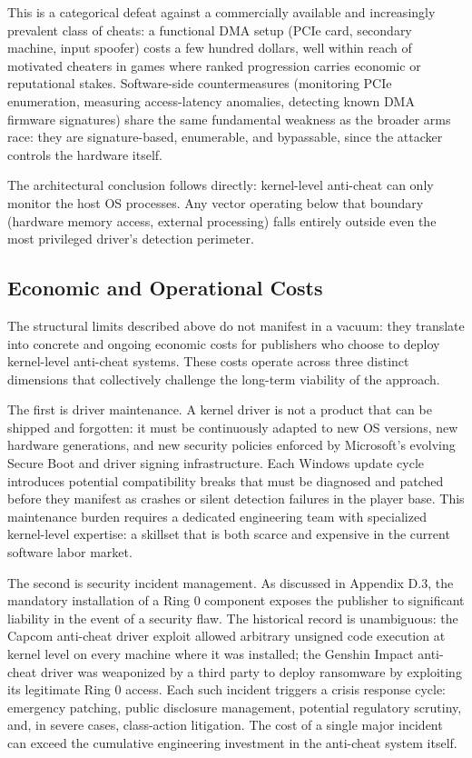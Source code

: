 This is a categorical defeat against a commercially available and increasingly prevalent class of cheats: a functional DMA setup (PCIe card, secondary machine, input spoofer) costs a few hundred dollars, well within reach of motivated cheaters in games where ranked progression carries economic or reputational stakes. Software-side countermeasures (monitoring PCIe enumeration, measuring access-latency anomalies, detecting known DMA firmware signatures) share the same fundamental weakness as the broader arms race: they are signature-based, enumerable, and bypassable, since the attacker controls the hardware itself.

The architectural conclusion follows directly: kernel-level anti-cheat can only monitor the host OS processes. Any vector operating below that boundary (hardware memory access, external processing) falls entirely outside even the most privileged driver's detection perimeter.

\subsection{Economic and Operational Costs}
\label{sec:two:one:three}

The structural limits described above do not manifest in a vacuum: they translate into concrete and ongoing economic costs for publishers who choose to deploy kernel-level anti-cheat systems. These costs operate across three distinct dimensions that collectively challenge the long-term viability of the approach.

The first is driver maintenance. A kernel driver is not a product that can be shipped and forgotten: it must be continuously adapted to new OS versions, new hardware generations, and new security policies enforced by Microsoft's evolving Secure Boot and driver signing infrastructure. Each Windows update cycle introduces potential compatibility breaks that must be diagnosed and patched before they manifest as crashes or silent detection failures in the player base. This maintenance burden requires a dedicated engineering team with specialized kernel-level expertise: a skillset that is both scarce and expensive in the current software labor market.

The second is security incident management. As discussed in Appendix D.3, the mandatory installation of a Ring 0 component exposes the publisher to significant liability in the event of a security flaw. The historical record is unambiguous: the Capcom anti-cheat driver exploit allowed arbitrary unsigned code execution at kernel level on every machine where it was installed; the Genshin Impact anti-cheat driver was weaponized by a third party to deploy ransomware by exploiting its legitimate Ring 0 access. Each such incident triggers a crisis response cycle: emergency patching, public disclosure management, potential regulatory scrutiny, and, in severe cases, class-action litigation. The cost of a single major incident can exceed the cumulative engineering investment in the anti-cheat system itself.


